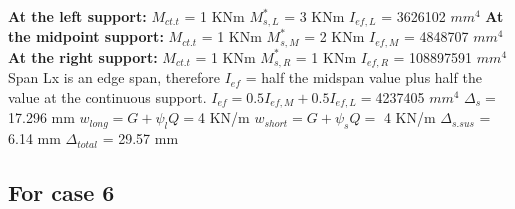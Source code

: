 \documentclass{article}%
\begin{document}
%
\newline%
\newline%
%
\textbf{At the left support:}%
\newline%
\newline%
%
$M_{ct.t}$ = 1 KNm%
\newline%
%
$M_{s,L}^{*}$ = 3 KNm%
\newline%
%
$I_{ef,L}$ = 3626102 $mm^{4}$%
\newline%
\newline%
%
\textbf{At the midpoint support:}%
\newline%
\newline%
%
$M_{ct.t}$ = 1 KNm%
\newline%
%
$M_{s,M}^{*}$ = 2 KNm%
\newline%
%
$I_{ef,M}$ = 4848707 $mm^{4}$%
\newline%
\newline%
%
\textbf{At the right support:}%
\newline%
\newline%
%
$M_{ct.t}$ = 1 KNm%
\newline%
%
$M_{s,R}^{*}$ = 1 KNm%
\newline%
%
$I_{ef,R}$ = 108897591 $mm^{4}$%
\newline%
\newline%
%
Span Lx is an edge span, therefore $I_{ef}$ = half the midspan value plus half the value at the continuous support.%
\newline%
\newline%
%
$I_{ef} = 0.5I_{ef,M} + 0.5I_{ef,L} = $4237405 $ mm^{4}$%
\newline%
\newline%
%
$\Delta_{s} =$17.296 mm%
\newline%
\newline%
%
$w_{long} = G + \psi_{l}Q = $4 KN/m%
\newline%
%
$w_{short} = G + \psi_{s}Q = $ 4 KN/m%
\newline%
\newline%
%
$\Delta_{s.sus}$ = 6.14 mm%
\newline%
\newline%
%
$\Delta_{total}$ = 29.57 mm%
\subsection*{For case 6}%
\label{subsec:Forcase6}%
\end{document}

